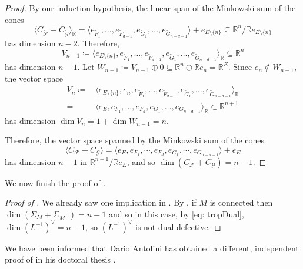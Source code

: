 \documentclass[12pt,a4paper,english]{scrartcl}
\newcommand{\RR}{\mathbb{R}}
\begin{document}
\begin{proof}
By our induction hypothesis, the linear span of the Minkowski sum of the cones
\[
\langle C_{\widetilde{\mathcal{F}}} + C_{\widetilde{\mathcal{G}}}\rangle_\RR = 
\langle
 e_{\widetilde{F}_1},\dots, e_{\widetilde{F}_{d-1}} ,  e_{\widetilde{G}_1}, \dots,  e_{\widetilde{{G}}_{n-d-1}}
\rangle + e_{E\setminus\{n\}} \subseteq \mathbb{R}^{n}/\RR e_{E\setminus\{n\}}
\]
has dimension $n-2$. Therefore,
\[
 V_{n-1} \coloneq \langle e_{E\setminus\{n\}},
 e_{\widetilde{F}_1},\dots, e_{\widetilde{F}_{d-1}} ,  e_{\widetilde{G}_1},\dots,  e_{\widetilde{G}_{n-d-1}}
\rangle_\RR \subseteq \mathbb{R}^{n}
\]
has dimension $n-1$. Let $W_{n-1} \coloneq V_{n-1}\oplus 0 \subseteq \RR^n \oplus \RR e_{n} = \RR^E$. Since $ e_{n} \notin W_{n-1}$, the vector space
\begin{align*}
V_n \coloneq& \, \langle 
 e_{E\setminus \{n\}},  e_{n},  e_{\widetilde{F}_1},\dots, e_{\widetilde{F}_{d-1}} ,  e_{\widetilde{G}_1}, \dots, e_{\widetilde{G}_{n-d-1}} \rangle_\RR \\
 =& \, \langle 
 e_{E},  e_{F_1},\dots, e_{F_{d}} ,  e_{G_1}, \dots, e_{G_{n-d-1}} \rangle_\RR \subset \RR^{n+1} 
\end{align*}
has dimension $\dim V_n = 1+\dim W_{n-1} = n$. 

Therefore, the vector space spanned by the Minkowski sum of the cones
\[
\langle C_{\mathcal{F}} + C_{\mathcal{G}} \rangle =   \langle 
 e_{E},  e_{F_1},\cdots, e_{F_{d}} ,  e_{G_1}, \cdots, e_{G_{n-d-1}} 
 \rangle +    e_{E}
\]
has dimension $n-1$ in $\mathbb{R}^{n+1}/\RR     e_{E}$, and so $\dim  (C_{\mathcal{F}} + C_{\mathcal{G}}) = n-1$.
\end{proof}

We now finish the proof of .



\begin{proof}[Proof of ]
We already saw one implication in .
   By , if $M$ is connected then $\dim (\Sigma_M + \Sigma_{M^\perp}) = n-1$ and so in this case, by \eqref{eq: tropDual},  $\dim (L^{-1})^\vee = n-1$, so $(L^{-1})^\vee$ is not dual-defective.
\end{proof}

\begin{remark}
We have been informed that Dario Antolini has obtained a different, independent proof of  in his doctoral thesis \cite{Antolini_2026}.
\end{remark}
\end{document}

